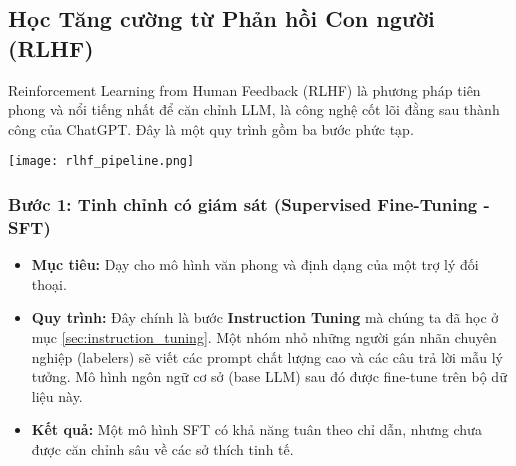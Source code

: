 \subsection{Học Tăng cường từ Phản hồi Con người (RLHF)}
\label{ssec:rlhf}
Reinforcement Learning from Human Feedback (RLHF) \cite{christiano2017deep, stiennon2020learning} là phương pháp tiên phong và nổi tiếng nhất để căn chỉnh LLM, là công nghệ cốt lõi đằng sau thành công của ChatGPT. Đây là một quy trình gồm ba bước phức tạp.

\begin{center}
    \texttt{[image: rlhf\_pipeline.png]}
    \label{fig:rlhf_pipeline}
\end{center}

\subsubsection{Bước 1: Tinh chỉnh có giám sát (Supervised Fine-Tuning - SFT)}
\begin{itemize}
    \item \textbf{Mục tiêu:} Dạy cho mô hình văn phong và định dạng của một trợ lý đối thoại.
    \item \textbf{Quy trình:} Đây chính là bước \textbf{Instruction Tuning} mà chúng ta đã học ở mục \ref{sec:instruction_tuning}. Một nhóm nhỏ những người gán nhãn chuyên nghiệp (labelers) sẽ viết các prompt chất lượng cao và các câu trả lời mẫu lý tưởng. Mô hình ngôn ngữ cơ sở (base LLM) sau đó được fine-tune trên bộ dữ liệu này.
    \item \textbf{Kết quả:} Một mô hình SFT có khả năng tuân theo chỉ dẫn, nhưng chưa được căn chỉnh sâu về các sở thích tinh tế.
\end{itemize}


